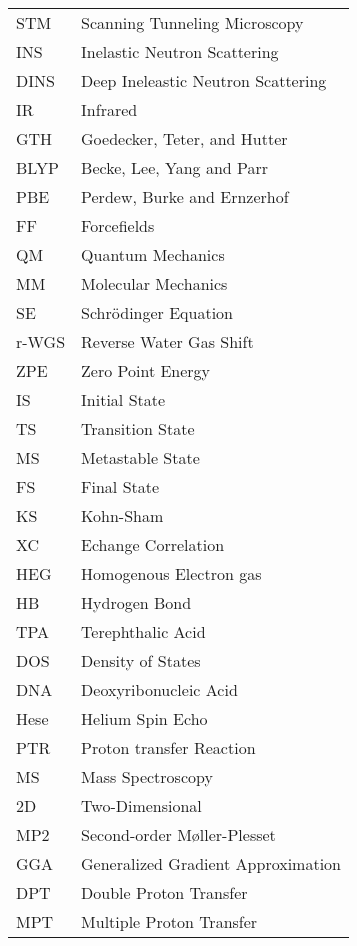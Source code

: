 \begin{table}[h]
 \begin{tabular}{l l}
STM & Scanning Tunneling Microscopy\\
INS & Inelastic Neutron Scattering\\
DINS & Deep Ineleastic Neutron Scattering \\
IR & Infrared \\
GTH & Goedecker, Teter, and Hutter \\
BLYP & Becke, Lee, Yang and Parr \\
PBE & Perdew, Burke and Ernzerhof \\
FF & Forcefields\\
QM & Quantum Mechanics \\
MM & Molecular Mechanics \\
SE &  Schr\"{o}dinger Equation \\
r-WGS & Reverse Water Gas Shift \\
ZPE & Zero Point Energy \\ 
IS & Initial State \\
TS & Transition State \\
MS & Metastable State \\
FS & Final State \\
KS & Kohn-Sham \\
XC & Echange Correlation \\
HEG & Homogenous Electron gas \\
HB & Hydrogen Bond\\
TPA & Terephthalic Acid\\
DOS & Density of States\\
DNA & Deoxyribonucleic Acid \\
Hese &  Helium Spin Echo \\
PTR & Proton transfer Reaction \\
MS & Mass Spectroscopy \\
2D & Two-Dimensional \\
MP2 & Second-order Møller-Plesset \\
GGA & Generalized Gradient Approximation \\
DPT & Double Proton Transfer \\
MPT & Multiple Proton Transfer \\
 \end{tabular}
\end{table}


